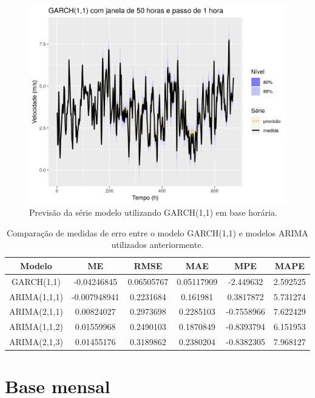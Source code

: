 \documentclass[
	12pt,				%
	openright,			%
	oneside,			%
	a4paper,			%
	english,			%
	french,				%
	spanish,			%
	brazil				%
	]{abntex2}
\begin{document}
\begin{figure}[h]
    \centering
	\includegraphics[width=\textwidth]{garch_first}
	\caption{Previsão da série modelo utilizando GARCH(1,1) em base horária.}
	\label{fig:garch}
\end{figure}
\FloatBarrier

\begin{table}[h]
\centering
\begin{tabular}{ |c|c|c|c|c|c| } 
\hline
\textbf{Modelo}&\textbf{ME}&\textbf{RMSE}&\textbf{MAE}&\textbf{MPE}&\textbf{MAPE}\\
\hline
GARCH(1,1)&-0.04246845&0.06505767&0.05117909&-2.449632&2.592525 \\
\hline
ARIMA(1,1,1)&-0.007948941&0.2231684&0.161981&0.3817872&5.731274 \\
\hline
ARIMA(2,1,1)&0.00824027&0.2973698&0.2285103&-0.7558966&7.622429 \\
\hline
ARIMA(1,1,2)&0.01559968&0.2490103&0.1870849&-0.8393794&6.151953 \\
\hline
ARIMA(2,1,3)&0.01455176&0.3189862&0.2380204&-0.8382305&7.968127 \\
\hline
\end{tabular}
\caption{Comparação de medidas de erro entre o modelo GARCH(1,1) e modelos ARIMA utilizados anteriormente.}
\end{table}

\section{Base mensal}
\end{document}
